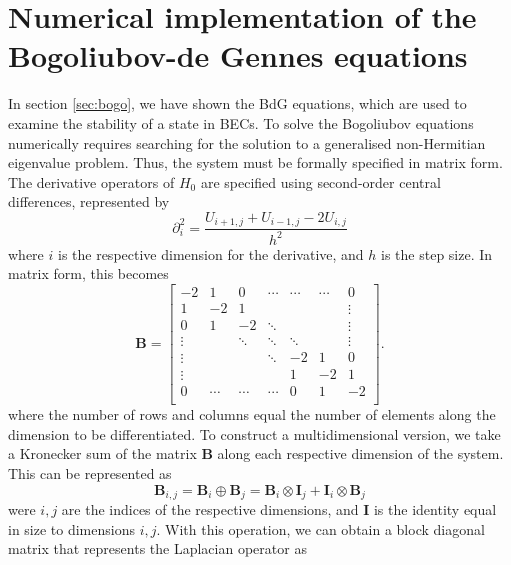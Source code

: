 \section{Numerical implementation of the Bogoliubov-de Gennes equations}
In section \ref{sec:bogo}, we have shown the BdG equations, which are used to examine the stability of a state in BECs. To solve the Bogoliubov equations numerically requires searching for the solution to a generalised non-Hermitian eigenvalue problem. Thus, the system must be formally specified in matrix form. The derivative operators of $H_0$ are specified using second-order central differences, represented by
\begin{equation}
    \partial^2_i = \frac{U_{i+1,j} + U_{i-1,j} - 2U_{i,j}}{h^2}
\end{equation}
where $i$ is the respective dimension for the derivative, and $h$ is the step size. In matrix form, this becomes
\begin{equation}
    \mathbf{B} =
    \begin{bmatrix}
            -2      &   1    &    0   &  \cdots   &  \cdots   &  \cdots   & 0 \\
            1       &   -2   &    1   &           &           &     &  \vdots \\
            0       &    1   &   -2   & \ddots    &           &     &  \vdots \\
            \vdots  &        & \ddots & \ddots    & {\ddots}  &     &  \vdots \\
            \vdots  &        &        & \ddots    &    -2     &  1  &       0 \\
            \vdots  &        &        &           &     1     & -2  &       1 \\
            0       & \cdots & \cdots & \cdots    &     0     &  1  &      -2 \\
        \end{bmatrix}.
\end{equation}
where the number of rows and columns equal the number of elements along the dimension to be differentiated. To construct a multidimensional version, we take a Kronecker sum of the matrix $\mathbf{B}$ along each respective dimension of the system. This can be represented as
\begin{equation}
    \mathbf{B}_{i,j} = \mathbf{B}_i \oplus \mathbf{B}_j = \mathbf{B}_i \otimes \mathbf{I}_j + \mathbf{I}_i \otimes \mathbf{B}_j
\end{equation}
were $i,j$ are the indices of the respective dimensions, and $\mathbf{I}$ is the identity equal in size to dimensions $i,j$. With this operation, we can obtain a block diagonal matrix that represents the Laplacian operator as

